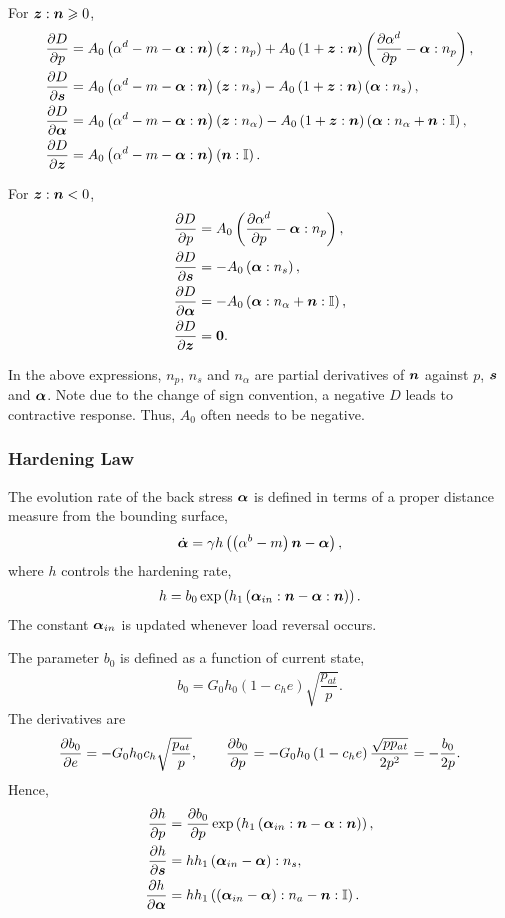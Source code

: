 For $\bm{z}:\bm{n}\geqslant0$,
\begin{align}
\dfrac{\partial{D}}{\partial{p}}&=A_0\left(\alpha^d-m-\bm{\alpha}:\bm{n}\right)\left(\bm{z}:n_p\right)+A_0\left(1+\bm{z}:\bm{n}\right)\left(\dfrac{\partial{\alpha^d}}{\partial{p}}-\bm{\alpha}:n_p\right),\\
\dfrac{\partial{D}}{\partial{\bm{s}}}&=A_0\left(\alpha^d-m-\bm{\alpha}:\bm{n}\right)\left(\bm{z}:n_s\right)-A_0\left(1+\bm{z}:\bm{n}\right)\left(\bm{\alpha}:n_s\right),\\
\dfrac{\partial{D}}{\partial{\bm{\alpha}}}&=A_0\left(\alpha^d-m-\bm{\alpha}:\bm{n}\right)\left(\bm{z}:n_\alpha\right)-A_0\left(1+\bm{z}:\bm{n}\right)\left(\bm{\alpha}:n_\alpha+\bm{n}:\mathbb{I}\right),\\
\dfrac{\partial{D}}{\partial{\bm{z}}}&=A_0\left(\alpha^d-m-\bm{\alpha}:\bm{n}\right)\left(\bm{n}:\mathbb{I}\right).
\end{align}

For $\bm{z}:\bm{n}<0$,
\begin{align}
\dfrac{\partial{D}}{\partial{p}}&=A_0\left(\dfrac{\partial{\alpha^d}}{\partial{p}}-\bm{\alpha}:n_p\right),\\
\dfrac{\partial{D}}{\partial{\bm{s}}}&=-A_0\left(\bm{\alpha}:n_s\right),\\
\dfrac{\partial{D}}{\partial{\bm{\alpha}}}&=-A_0\left(\bm{\alpha}:n_\alpha+\bm{n}:\mathbb{I}\right),\\
\dfrac{\partial{D}}{\partial{\bm{z}}}&=\bm{0}.
\end{align}

In the above expressions, $n_p$, $n_s$ and $n_\alpha$ are partial derivatives of $\bm{n}$ against $p$, $\bm{s}$ and $\bm{\alpha}$. Note due to the change of sign convention, a negative $D$ leads to contractive response. Thus, $A_0$ often needs to be negative.
\subsubsection{Hardening Law}
The evolution rate of the back stress $\bm{\alpha}$ is defined in terms of a proper distance measure from the bounding surface,
\begin{gather}
\dot{\bm{\alpha}}=\gamma{}h\left(\left(\alpha^b-m\right)\bm{n}-\bm{\alpha}\right),
\end{gather}
where $h$ controls the hardening rate,
\begin{gather}
h=b_0\exp\left(h_1\left(\bm{\alpha}_{in}:\bm{n}-\bm{\alpha}:\bm{n}\right)\right).
\end{gather}
The constant $\bm{\alpha}_{in}$ is updated whenever load reversal occurs.

The parameter $b_0$ is defined as a function of current state,
\begin{gather}
b_0=G_0h_0\left(1-c_he\right)\sqrt{\dfrac{p_{at}}{p}}.
\end{gather}
The derivatives are
\begin{gather}
\dfrac{\partial{b_0}}{\partial{e}}=-G_0h_0c_h\sqrt{\dfrac{p_{at}}{p}},\qquad
\dfrac{\partial{b_0}}{\partial{p}}=-G_0h_0\left(1-c_he\right)\dfrac{\sqrt{pp_{at}}}{2p^2}=-\dfrac{b_0}{2p}.
\end{gather}
Hence,
\begin{align}
\dfrac{\partial{h}}{\partial{p}}&=\dfrac{\partial{b_0}}{\partial{p}}\exp\left(h_1\left(\bm{\alpha}_{in}:\bm{n}-\bm{\alpha}:\bm{n}\right)\right),\\
\dfrac{\partial{h}}{\partial{\bm{s}}}&=hh_1\left(\bm{\alpha}_{in}-\bm{\alpha}\right):n_s,\\
\dfrac{\partial{h}}{\partial{\bm{\alpha}}}&=hh_1\left(\left(\bm{\alpha}_{in}-\bm{\alpha}\right):n_a-\bm{n}:\mathbb{I}\right).
\end{align}
